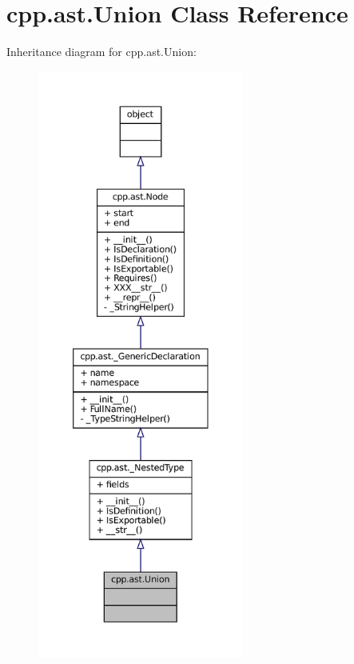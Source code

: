 \hypertarget{classcpp_1_1ast_1_1Union}{}\section{cpp.\+ast.\+Union Class Reference}
\label{classcpp_1_1ast_1_1Union}


Inheritance diagram for cpp.\+ast.\+Union\+:
\nopagebreak
\begin{figure}[H]
\begin{center}
\leavevmode
\includegraphics[height=550pt]{classcpp_1_1ast_1_1Union__inherit__graph}
\end{center}
\end{figure}


